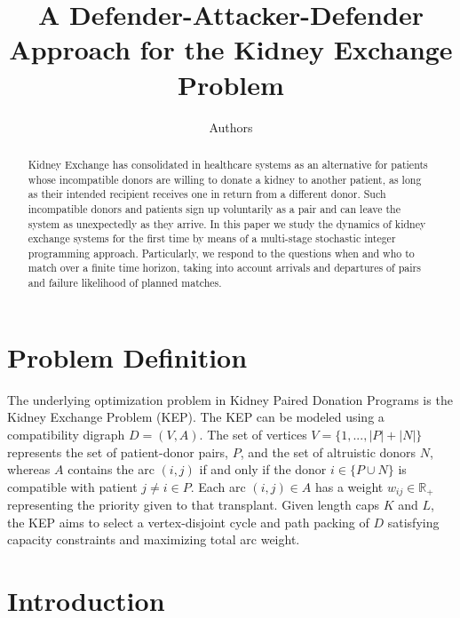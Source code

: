 \documentclass{article}
\title{A Defender-Attacker-Defender Approach for the Kidney Exchange Problem}
\author{Authors}
\begin{document}
	\maketitle
	
	\begin{abstract}
		Kidney Exchange has consolidated in healthcare systems as an alternative for patients whose incompatible donors are willing to donate a kidney to another patient, as long as their intended recipient receives one in return from a different donor. Such incompatible donors and patients sign up voluntarily as a pair and can leave the system as unexpectedly as they arrive. In this paper we study the dynamics of kidney exchange systems for the first time by means of a multi-stage stochastic integer programming approach. Particularly, we respond to the questions when and who to match over a finite time horizon, taking into account arrivals and departures of pairs and failure likelihood of planned matches.
	\end{abstract}
	
	
	\section{Problem Definition}
	\label{sec:ProblemDefinition}
	
	The underlying optimization problem in Kidney Paired Donation Programs is the Kidney Exchange Problem (KEP). The KEP can be modeled using a compatibility digraph $D = (V,A)$. The set of vertices $V = \{1,...,|P|+|N|\}$ represents the set of patient-donor pairs, $P$, and the set of altruistic donors $N$, whereas $A$ contains the arc $(i,j)$ if and only if the donor $i \in \{P \cup N\}$ is compatible with patient $j  \neq i \in P$. Each arc $(i,j) \in A$ has a weight $w_{ij} \in \mathbb{R_{+}}$ representing the priority given to that transplant. Given length caps $K$ and $L$, the KEP aims to select a vertex-disjoint cycle and path packing of $D$ satisfying capacity constraints and maximizing total arc weight.
	
	
	\section{Introduction}
	
\end{document}
